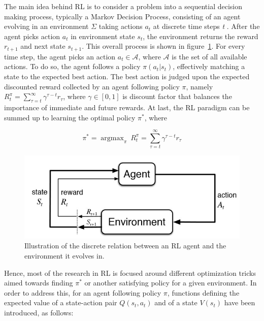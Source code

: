\documentclass[twocolumn]{article}
\DeclareMathOperator*{\argmax}{argmax}
\begin{document}
The main idea behind RL is to consider a problem into a sequential decision making process, typically a Markov Decision Process, consisting of an agent evolving in an environment $\Sigma $ taking actions \textit{$a_t$} at discrete time steps \textit{t} \citep{sutton2018reinforcement}. After the agent picks action \textit{$a_t$} in environment state \textit{$s_t$}, the environment returns the reward \textit{$r_{t+1}$} and next state \textit{$s_{t+1}$}. This overall process is shown in figure~\ref{fig:rl}. For every time step, the agent picks an action $a_t \in \mathcal{A}$, where $\mathcal{A}$ is the set of all available actions. To do so, the agent follows a policy $\pi(a_t|s_t)$, effectively matching a state to the expected best action. The best action is judged upon the expected discounted reward collected by an agent following policy $\pi$, namely
$R_t^{\pi} = \sum_{\tau=t}^\infty \gamma^{\tau - t}r_{\tau}$, where $\gamma \in [0, 1]$ is discount factor that balances the importance of immediate and future rewards. At last, the RL paradigm can be summed up to learning the optimal policy $\pi^*$, where

\begin{equation*}
\pi^* = \argmax_{\pi} \> R_t^{\pi} = \sum_{\tau=t}^\infty \gamma^{\tau - t}r_{\tau}
\label{eq:pi_star}
\end{equation*}

\begin{figure}[]
\centering
\vspace*{-0.15in}
\includegraphics[scale=0.55]{reinforcement-learning-fig1-700.jpg}
\vspace*{-0.3in}
\caption{Illustration of the discrete relation between an RL agent and the environment it evolves in.}
\label{fig:rl}
\end{figure}


Hence, most of the research in RL is focused around different optimization tricks aimed towards finding $\pi^*$ or another satisfying policy for a given environment. In order to address this, for an agent following policy $\pi$, functions defining the expected value of a state-action pair $Q(s_t, a_t)$ and of a state $V(s_t)$ have been introduced, as follows:
\end{document}
